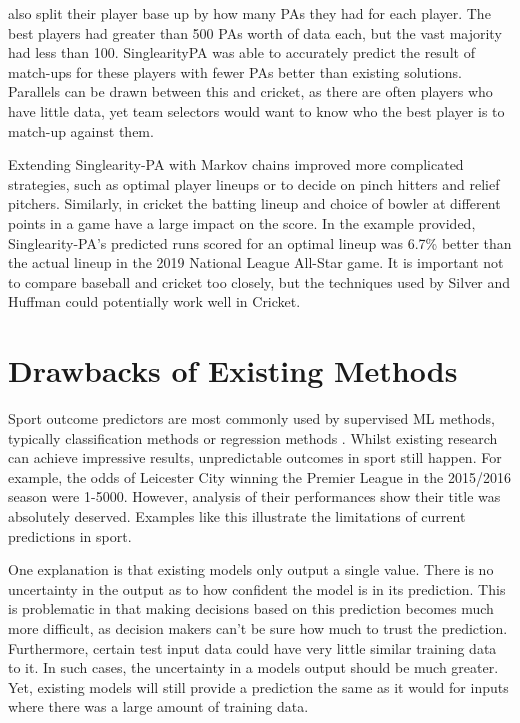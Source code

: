 \documentclass[12pt,a4paper]{report}
\theoremstyle{definition}
\begin{document}
\citet{silver2021baseball} also split their player base up by how many PAs they had for each player. 
The best players had greater than 500 PAs worth of data each, but the vast majority had less than 100. 
SinglearityPA was able to accurately predict the result of match-ups for these players with fewer PAs better than existing solutions. 
Parallels can be drawn between this and cricket, as there are often players who have little data, yet team selectors would want to know who the best player is to match-up against them.

Extending Singlearity-PA with Markov chains improved more complicated strategies, such as optimal player lineups or to decide on pinch hitters and relief pitchers. 
Similarly, in cricket the batting lineup and choice of bowler at different points in a game have a large impact on the score. 
In the example provided, Singlearity-PA's predicted runs scored for an optimal lineup was 6.7\% better than the actual lineup in the 2019 National League All-Star game. 
It is important not to compare baseball and cricket too closely, but the techniques used by Silver and Huffman could potentially work well in Cricket.

\section{Drawbacks of Existing Methods}

Sport outcome predictors are most commonly used by supervised ML methods, typically classification methods or regression methods \citep{horvat2020}. 
Whilst existing research can achieve impressive results, unpredictable outcomes in sport still happen. For example, the odds of Leicester City winning the Premier League in the 2015/2016 season were 1-5000. 
However, analysis of their performances show their title was absolutely deserved.
Examples like this illustrate the limitations of current predictions in sport.

One explanation is that existing models only output a single value. 
There is no uncertainty in the output as to how confident the model is in its prediction. 
This is problematic in that making decisions based on this prediction becomes much more difficult, as decision makers can't be sure how much to trust the prediction. 
Furthermore, certain test input data could have very little similar training data to it. 
In such cases, the uncertainty in a models output should be much greater. 
Yet, existing models will still provide a prediction the same as it would for inputs where there was a large amount of training data.
\end{document}
